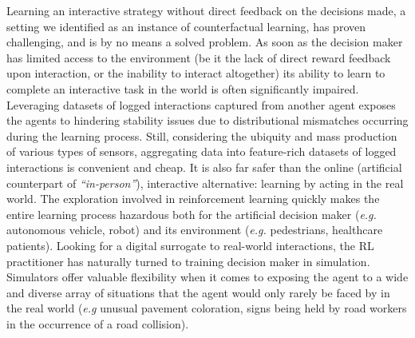 Learning an interactive strategy without direct feedback on the decisions made,
a setting we identified as an instance of counterfactual learning,
has proven challenging, and is by no means a solved problem.
As soon as the decision maker has limited access to the environment (be it the lack of direct reward feedback
upon interaction, or the inability to interact altogether)
its ability to learn to complete an interactive task in the world is often significantly impaired.
Leveraging datasets of logged interactions captured from another agent exposes the agents to
hindering stability issues due to distributional mismatches occurring during the learning process.
Still, considering the ubiquity and mass production of various types of sensors,
aggregating data into feature-rich datasets of logged interactions is convenient and cheap.
It is also far safer than the online (artificial counterpart of \textit{``in-person''}), interactive
alternative: learning by acting in the real world.
The exploration involved in reinforcement learning quickly makes the entire learning process hazardous
both for the artificial decision maker (\textit{e.g.} autonomous vehicle, robot)
and its environment (\textit{e.g.} pedestrians, healthcare patients).
Looking for a digital surrogate to real-world interactions,
the RL practitioner has naturally turned to training decision maker in simulation.
Simulators offer valuable flexibility when it comes to exposing the agent to a wide and diverse
array of situations that the agent would only rarely be faced by in the real world
(\textit{e.g} unusual pavement coloration, signs being held by road workers in the occurrence of a road collision).

